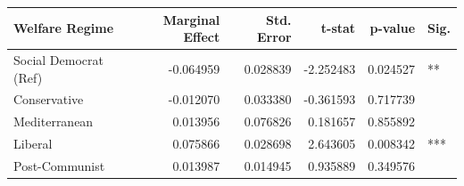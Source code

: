 \begin{tabular}{lrrrrl}
\toprule
Welfare Regime & Marginal Effect & Std. Error & t-stat & p-value & Sig. \\
\midrule
Social Democrat (Ref) & -0.064959 & 0.028839 & -2.252483 & 0.024527 & ** \\
Conservative & -0.012070 & 0.033380 & -0.361593 & 0.717739 &  \\
Mediterranean & 0.013956 & 0.076826 & 0.181657 & 0.855892 &  \\
Liberal & 0.075866 & 0.028698 & 2.643605 & 0.008342 & *** \\
Post-Communist & 0.013987 & 0.014945 & 0.935889 & 0.349576 &  \\
\bottomrule
\end{tabular}
